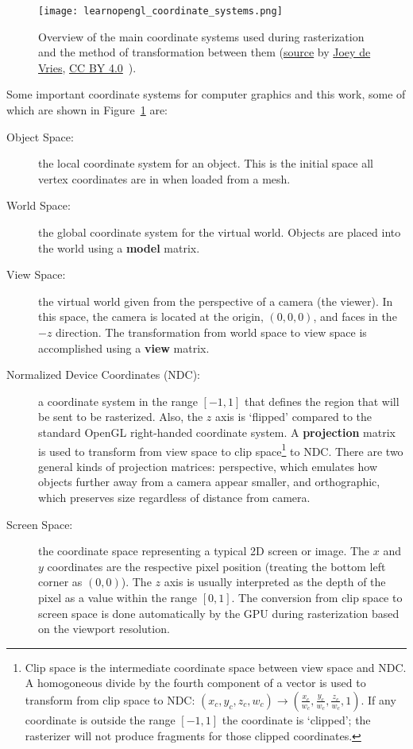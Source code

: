 \begin{figure}[h]
\centering
\texttt{[image: learnopengl\_coordinate\_systems.png]}
\caption{Overview of the main coordinate systems used during rasterization and the method of transformation between them (\href{https://learnopengl.com/img/getting-started/coordinate_systems.png}{source} by \href{https://twitter.com/JoeyDeVriez}{Joey de Vries}, \href{https://creativecommons.org/licenses/by/4.0/}{CC BY 4.0}~\cite{learnopengl}).}
\label{fig:coordinate_systems}
\end{figure}

Some important coordinate systems for computer graphics and this work, some of which are shown in Figure~\ref{fig:coordinate_systems} are:
\begin{description}
    \item[Object Space:] the local coordinate system for an object. This is the initial space all vertex coordinates are in when loaded from a mesh.
    \item[World Space:] the global coordinate system for the virtual world. Objects are placed into the world using a \textbf{model} matrix.
    \item[View Space:] the virtual world given from the perspective of a camera (the viewer). In this space, the camera is located at the origin, $(0,0,0)$, and faces in the $-z$ direction. The transformation from world space to view space is accomplished using a \textbf{view} matrix.
    \item[Normalized Device Coordinates (NDC):] a coordinate system in the range $[-1, 1]$ that defines the region that will be sent to be rasterized. Also, the $z$ axis is `flipped' compared to the standard OpenGL right-handed coordinate system. A \textbf{projection} matrix is used to transform from view space to clip space\footnote{Clip space is the intermediate coordinate space between view space and NDC. A homogoneous divide by the fourth component of a vector is used to transform from clip space to NDC: $(x_c, y_c, z_c, w_c) \rightarrow (\frac{x_c}{w_c}, \frac{y_c}{w_c}, \frac{z_c}{w_c}, 1)$. If any coordinate is outside the range $[-1, 1]$ the coordinate is `clipped'; the rasterizer will not produce fragments for those clipped coordinates. } to NDC. There are two general kinds of projection matrices: perspective, which emulates how objects further away from a camera appear smaller, and orthographic, which preserves size regardless of distance from camera.
    \item[Screen Space:] the coordinate space representing a typical 2D screen or image. The $x$ and $y$ coordinates are the respective pixel position (treating the bottom left corner as $(0,0)$). The $z$ axis is usually interpreted as the depth of the pixel as a value within the range $[0, 1]$. The conversion from clip space to screen space is done automatically by the GPU during rasterization based on the viewport resolution.

\end{description}
